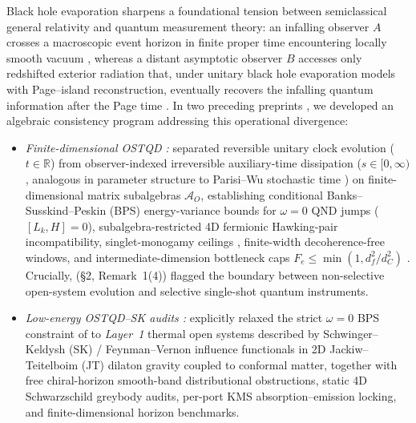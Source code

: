 \documentclass[11pt,a4paper]{article}
\theoremstyle{definition}
\theoremstyle{remark}
\newcommand{\cA}{\mathcal{A}}
\newcommand{\bbR}{\mathbb{R}}
\newcommand{\1}{\mathbf{1}}
\begin{document}
Black hole evaporation \cite{Hawking1975,Unruh1976,Page1993} sharpens a foundational tension between semiclassical general relativity and quantum measurement theory: an infalling observer $A$ crosses a macroscopic event horizon in finite proper time encountering locally smooth vacuum \cite{UnruhWald2017,NomuraVarelaWeinberg2013}, whereas a distant asymptotic observer $B$ accesses only redshifted exterior radiation that, under unitary black hole evaporation models with Page--island reconstruction, eventually recovers the infalling quantum information after the Page time \cite{Susskind1993,AMPS2013,Penington2020,AlmheiriIslands2020,PSSY2022}. In two preceding preprints \cite{Soga2026OSTQD,Soga2026OSTQDSK}, we developed an algebraic consistency program addressing this operational divergence:
\begin{itemize}
  \item \emph{Finite-dimensional OSTQD \cite{Soga2026OSTQD}:} separated reversible unitary clock evolution ($t\in\bbR$) from observer-indexed irreversible auxiliary-time dissipation ($s\in[0,\infty)$, analogous in parameter structure to Parisi--Wu stochastic time \cite{ParisiWu1981}) on finite-dimensional matrix subalgebras $\cA_O$, establishing conditional Banks--Susskind--Peskin (BPS) \cite{BPS1984} energy-variance bounds for $\omega=0$ QND jumps ($[L_k,H]=0$), subalgebra-restricted 4D fermionic Hawking-pair incompatibility, singlet-monogamy ceilings \cite{Kay2009}, finite-width decoherence-free windows, and intermediate-dimension bottleneck caps $F_e\le\min(1,d_f^2/d_C^2)$ \cite{Schumacher1996,Petz1986}. Crucially, \cite{Soga2026OSTQD} (\S2, Remark~1(4)) flagged the boundary between non-selective open-system evolution and selective single-shot quantum instruments.
  \item \emph{Low-energy OSTQD--SK audits \cite{Soga2026OSTQDSK}:} explicitly relaxed the strict $\omega=0$ BPS constraint of \cite{Soga2026OSTQD} to \emph{Layer~1} thermal open systems described by Schwinger--Keldysh (SK) / Feynman--Vernon influence functionals \cite{Schwinger1961,Keldysh1964,FeynmanVernon1963} in 2D Jackiw--Teitelboim (JT) dilaton gravity coupled to conformal matter, together with free chiral-horizon smooth-band distributional obstructions, static 4D Schwarzschild greybody audits, per-port KMS absorption--emission locking, and finite-dimensional horizon benchmarks.
\end{itemize}
\end{document}
